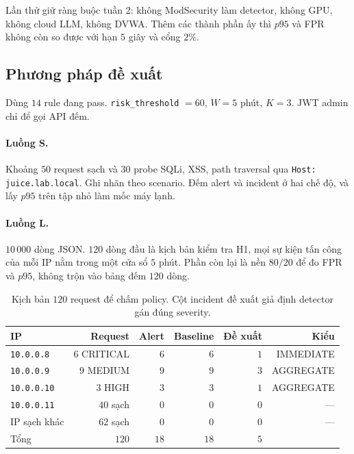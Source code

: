 \documentclass[a4paper,11pt]{article}
\begin{document}
Lần thử giữ ràng buộc tuần 2: không ModSecurity làm detector, không GPU, không cloud LLM, không DVWA. Thêm các thành phần ấy thì $p95$ và FPR không còn so được với hạn $5$ giây và cổng $2\%$.

\subsection{Phương pháp đề xuất}
\label{sec:pilot-method}

Dùng $14$ rule đang pass. \texttt{risk\_threshold} ${=} 60$, $W{=}5$ phút, $K{=}3$. JWT admin chỉ để gọi API đếm.

\paragraph{Luồng S.}
Khoảng $50$ request sạch và $30$ probe SQLi, XSS, path traversal qua \texttt{Host: juice.lab.local}. Ghi nhãn theo scenario. Đếm alert và incident ở hai chế độ, và lấy $p95$ trên tập nhỏ làm mốc máy lạnh.

\paragraph{Luồng L.}
$10\,000$ dòng JSON. $120$ dòng đầu là kịch bản kiểm tra H1, mọi sự kiện tấn công của mỗi IP nằm trong một cửa sổ $5$ phút. Phần còn lại là nền $80/20$ để đo FPR và $p95$, không trộn vào bảng đếm $120$ dòng.

\begin{table}[ht]
\centering
\caption{Kịch bản $120$ request để chấm policy. Cột incident đề xuất giả định detector gán đúng severity.}
\label{tab:scenario}
\small
\begin{tabular}{@{}lrrrrr@{}}
\toprule
IP & Request & Alert & Baseline & Đề xuất & Kiểu \\
\midrule
\texttt{10.0.0.8} & $6$ CRITICAL & $6$ & $6$ & $1$ & IMMEDIATE \\
\texttt{10.0.0.9} & $9$ MEDIUM & $9$ & $9$ & $3$ & AGGREGATE \\
\texttt{10.0.0.10} & $3$ HIGH & $3$ & $3$ & $1$ & AGGREGATE \\
\texttt{10.0.0.11} & $40$ sạch & $0$ & $0$ & $0$ & --- \\
IP sạch khác & $62$ sạch & $0$ & $0$ & $0$ & --- \\
\midrule
Tổng & $120$ & $18$ & $18$ & $5$ & \\
\bottomrule
\end{tabular}
\end{table}
\end{document}

